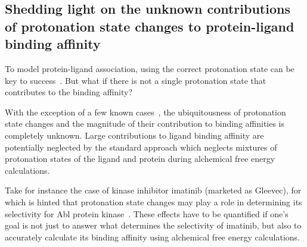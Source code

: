 \documentclass[10pt,final]{article}
\begin{document}
\subsection*{Shedding light on the unknown contributions of protonation state changes to protein-ligand binding affinity} %
To model protein-ligand association, using the correct protonation state can be key to success~\cite{Polgar2005a,Wittayanarakul2008a}. %
But what if there is not a single protonation state that contributes to the binding affinity?

With the exception of a few known cases~\cite{Aleksandrov2007a,Czodrowski2007a,Steuber2007a,Czodrowski2007b},  %
the ubiquitousness %
of protonation state changes and the magnitude of their contribution to binding affinities is completely unknown. %
Large contributions to ligand binding affinity are potentially neglected by the standard approach which neglects mixtures of protonation states of the ligand and protein during alchemical free energy calculations.

Take for instance the case of kinase inhibitor imatinib (marketed as Gleevec), for which is hinted that protonation state changes may play a role in determining its selectivity for Abl protein kinase~\cite{Lin2013a}. %
These effects have to be quantified if one's goal is not just to answer what determines the selectivity of imatinib, but also to accurately calculate its binding affinity using alchemical free energy calculations.
\end{document}
